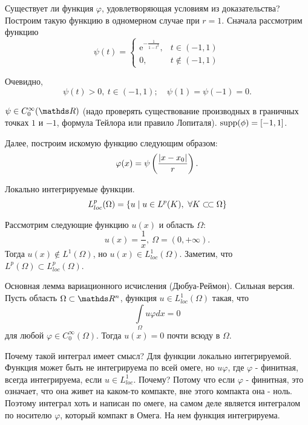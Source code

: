 \begin{note}
Существует ли функция $\varphi$, удовлетворяющая условиям из доказательства? 
Построим такую функцию в одномерном случае при $r = 1$. Сначала рассмотрим функцию
$$
    \psi(t) =
        \begin{cases} 
            \mathrm{e}^{-\frac{1}{1 - t^2}}, & t \in (-1, 1) \\
            0, & t \notin (-1, 1) 
        \end{cases}
$$

Очевидно, 
$$\psi(t) > 0, \ t \in (-1, 1); \quad \psi(1) = \psi(-1) = 0.$$ 

$\psi \in C_0^\infty(\real)$ (надо проверять существование производных в граничных точках $1$ и $-1$, формула Тейлора или правило Лопиталя). 
$\operatorname{supp}(\phi) = [-1, 1]$.

Далее, построим искомую функцию следующим образом:
$$\varphi(x) = \psi \left(\frac{\lvert x - x_0\rvert}{r}\right).$$
\end{note}

\begin{definition}{Локально интегрируемые функции.}
$$L_{loc}^p(\Omega) = \{u \mid u \in L^p(K),\ \forall K \ssubset \Omega\}$$
\end{definition}

\begin{example} Рассмотрим следующие функцию $u(x)$ и область $\Omega$:
$$u(x) = \frac{1}{x},\ \Omega = (0, +\infty).$$
Тогда $u(x) \notin L^1(\Omega)$, но $u(x) \in L_{loc}^1(\Omega)$. Заметим, что $L^p(\Omega) \subset L_{loc}^p(\Omega)$.
\end{example}

\begin{lemma}{Основная лемма вариационного исчисления (Дюбуа-Реймон). Сильная версия.}
Пусть область $\Omega \subset \real^n$, функция $u \in L_{loc}^1(\Omega)$ такая, что 
$$\int \limits_{\Omega} u \varphi dx = 0$$ 
для любой $\varphi \in C_0^\infty(\Omega)$. Тогда $u(x) = 0$ почти всюду в $\Omega$.
\end{lemma}

Почему такой интеграл имеет смысл? Для функции локально интегрируемой. Функция может быть не интегрируема по всей омеге, но $u\varphi$, где $\varphi$ - финитная, всегда интегрируема, если $u \in L_{loc}^1$. Почему? Потому что если $\varphi$ - финитная, это означает, что она живет на каком-то компакте, вне этого компакта она - ноль. Поэтому интеграл хоть и написан по омеге, на самом деле является интегралом по носителю $\varphi$, который компакт в Омега. На нем функция интегрируема.

